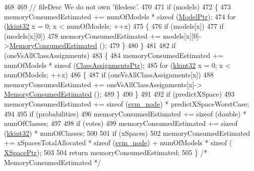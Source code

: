 \begin{DoxyCode}
468 
469   \textcolor{comment}{// fileDesc  We do not own 'filedesc'.}
470 
471   \textcolor{keywordflow}{if}  (models)
472   \{
473     memoryConsumedEstimated +=  numOfModels * \textcolor{keyword}{sizeof} (\hyperlink{namespace_k_k_m_l_l_a5e593621576d583bef55408bd6a3cfd5}{ModelPtr});
474     \textcolor{keywordflow}{for}  (\hyperlink{namespace_k_k_b_a8fa4952cc84fda1de4bec1fbdd8d5b1b}{kkint32} x = 0;  x < numOfModels;  ++x)
475     \{
476       \textcolor{keywordflow}{if}  (models[x])
477       \textcolor{keywordflow}{if}  (models[x][0])
478        memoryConsumedEstimated += models[x][0]->\hyperlink{struct_s_v_m233_1_1_svm_model233_ad4c875fdeca568622f1d72918e39bb78}{MemoryConsumedEstimated} ();
479     \}
480   \}
481 
482   \textcolor{keywordflow}{if}  (oneVsAllClassAssignments)
483   \{
484     memoryConsumedEstimated += numOfModels * \textcolor{keyword}{sizeof} (\hyperlink{namespace_k_k_m_l_l_ae085749533329dd0fe12b6221ad79b03}{ClassAssignmentsPtr});
485     \textcolor{keywordflow}{for}  (\hyperlink{namespace_k_k_b_a8fa4952cc84fda1de4bec1fbdd8d5b1b}{kkint32} x = 0;  x < numOfModels;  ++x)
486     \{
487       \textcolor{keywordflow}{if}  (oneVsAllClassAssignments[x])
488         memoryConsumedEstimated += oneVsAllClassAssignments[x]->
      \hyperlink{class_k_k_m_l_l_1_1_class_assignments_a9fa44a1925ecd559e96d49a7f4873c27}{MemoryConsumedEstimated} ();
489     \}
490   \}
491 
492   \textcolor{keywordflow}{if}  (predictXSpace)
493      memoryConsumedEstimated += \textcolor{keyword}{sizeof} (\hyperlink{struct_s_v_m233_1_1svm__node}{svm\_node}) * predictXSpaceWorstCase;
494 
495   \textcolor{keywordflow}{if}  (probabilities)
496      memoryConsumedEstimated += \textcolor{keyword}{sizeof} (double) * numOfClasses;
497 
498   \textcolor{keywordflow}{if}  (votes)
499      memoryConsumedEstimated += \textcolor{keyword}{sizeof} (\hyperlink{namespace_k_k_b_a8fa4952cc84fda1de4bec1fbdd8d5b1b}{kkint32}) * numOfClasses;
500 
501   \textcolor{keywordflow}{if}  (xSpaces)
502     memoryConsumedEstimated += xSpacesTotalAllocated * \textcolor{keyword}{sizeof} (\hyperlink{struct_s_v_m233_1_1svm__node}{svm\_node}) + numOfModels * \textcolor{keyword}{sizeof} (
      \hyperlink{struct_s_v_m233_1_1svm__node}{XSpacePtr});
503 
504   \textcolor{keywordflow}{return}  memoryConsumedEstimated;
505 \}  \textcolor{comment}{/* MemoryConsumedEstimated */}
\end{DoxyCode}
